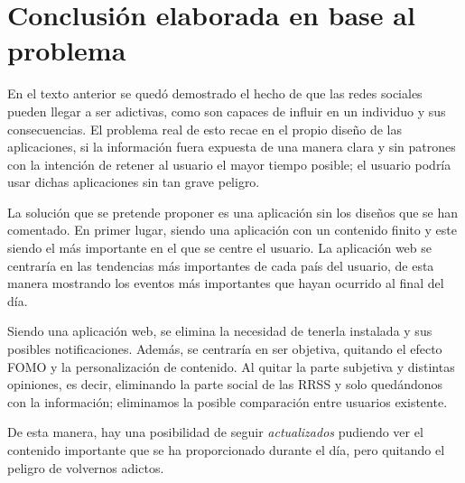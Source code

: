 \section{Conclusión elaborada en base al problema}

En el texto anterior se quedó demostrado el hecho de que las redes sociales pueden llegar a ser adictivas, como son capaces de influir en un individuo y sus consecuencias. El problema real de esto recae en el propio diseño de las aplicaciones, 
si la información fuera expuesta de una manera clara y sin patrones con la intención de retener al usuario el mayor tiempo posible; el usuario podría usar dichas aplicaciones sin tan grave peligro.

\vspace{0.3cm}

La solución que se pretende proponer es una aplicación sin los diseños que se han comentado. En primer lugar, siendo una aplicación con un contenido finito y este siendo el más importante en el que se centre el usuario. La aplicación web se centraría en las tendencias más importantes de cada país del usuario, de esta manera mostrando los eventos más importantes que hayan ocurrido al final del día.

\vspace{0.3cm}

Siendo una aplicación web, se elimina la necesidad de tenerla instalada y sus posibles notificaciones. Además, se centraría en ser objetiva, quitando el efecto \acs{FOMO} y la personalización de contenido. Al quitar la parte subjetiva y distintas opiniones, es decir, eliminando la parte social de las \acs{RRSS} y solo quedándonos con la información; eliminamos la posible comparación entre usuarios existente.

\vspace{0.3cm}

De esta manera, hay una posibilidad de seguir \textit{actualizados} pudiendo ver el contenido importante que se ha proporcionado durante el día, pero quitando el peligro de volvernos adictos.

